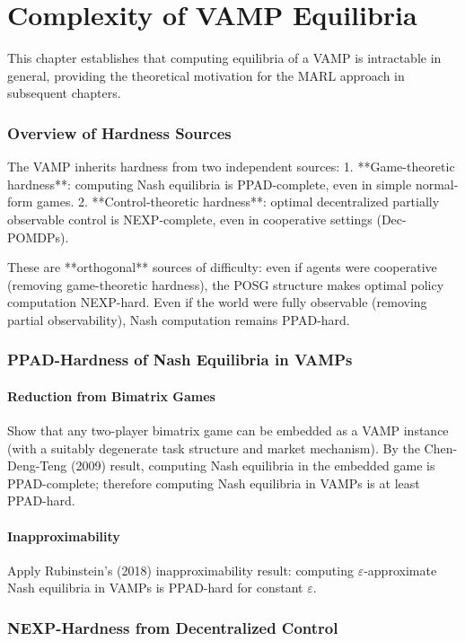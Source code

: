 \chapter{Complexity of VAMP Equilibria}\label{chap:equilibria}

This chapter establishes that computing equilibria of a VAMP is intractable in general, providing the theoretical motivation for the MARL approach in subsequent chapters.

\subsection{Overview of Hardness Sources}
The VAMP inherits hardness from two independent sources:
1. **Game-theoretic hardness**: computing Nash equilibria is PPAD-complete, even in simple normal-form games.
2. **Control-theoretic hardness**: optimal decentralized partially observable control is NEXP-complete, even in cooperative settings (Dec-POMDPs).

These are **orthogonal** sources of difficulty: even if agents were cooperative (removing game-theoretic hardness), the POSG structure makes optimal policy computation NEXP-hard. Even if the world were fully observable (removing partial observability), Nash computation remains PPAD-hard.

\subsection{PPAD-Hardness of Nash Equilibria in VAMPs}

\subsubsection{Reduction from Bimatrix Games}
Show that any two-player bimatrix game can be embedded as a VAMP instance (with a suitably degenerate task structure and market mechanism). By the Chen-Deng-Teng (2009) result, computing Nash equilibria in the embedded game is PPAD-complete; therefore computing Nash equilibria in VAMPs is at least PPAD-hard.

\subsubsection{Inapproximability}
Apply Rubinstein's (2018) inapproximability result: computing $\varepsilon$-approximate Nash equilibria in VAMPs is PPAD-hard for constant $\varepsilon$.

\subsection{NEXP-Hardness from Decentralized Control}

